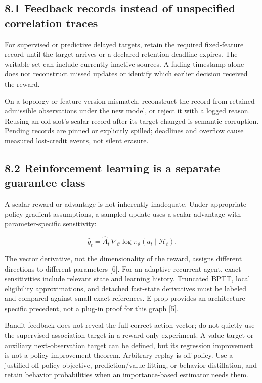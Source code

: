 \documentclass[
  11pt,
  a4paper,
]{article}
\begin{document}
\subsection{8.1 Feedback records instead of unspecified correlation
traces}\label{feedback-records-instead-of-unspecified-correlation-traces}

For supervised or predictive delayed targets, retain the required
fixed-feature record until the target arrives or a declared retention
deadline expires. The writable set can include currently inactive
sources. A fading timestamp alone does not reconstruct missed updates or
identify which earlier decision received the reward.

On a topology or feature-version mismatch, reconstruct the record from
retained admissible observations under the new model, or reject it with
a logged reason. Reusing an old slot's scalar record after its target
changed is semantic corruption. Pending records are pinned or explicitly
spilled; deadlines and overflow cause measured lost-credit events, not
silent erasure.

\subsection{8.2 Reinforcement learning is a separate guarantee
class}\label{reinforcement-learning-is-a-separate-guarantee-class}

A scalar reward or advantage is not inherently inadequate. Under
appropriate policy-gradient assumptions, a sampled update uses a scalar
advantage with parameter-specific sensitivity:

\[
\widehat g_t=\widehat A_t\,
\nabla_\vartheta\log\pi_\vartheta(a_t\mid\mathscr H_t).
\tag{25}
\]

The vector derivative, not the dimensionality of the reward, assigns
different directions to different parameters {[}6{]}. For an adaptive
recurrent agent, exact sensitivities include relevant state and learning
history. Truncated BPTT, local eligibility approximations, and detached
fast-state derivatives must be labeled and compared against small exact
references. E-prop provides an architecture-specific precedent, not a
plug-in proof for this graph {[}5{]}.

Bandit feedback does not reveal the full correct action vector; do not
quietly use the supervised association target in a reward-only
experiment. A value target or auxiliary next-observation target can be
defined, but its regression improvement is not a policy-improvement
theorem. Arbitrary replay is off-policy. Use a justified off-policy
objective, prediction/value fitting, or behavior distillation, and
retain behavior probabilities when an importance-based estimator needs
them.
\end{document}
